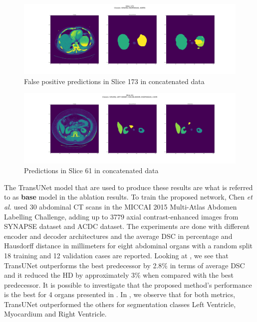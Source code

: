 \documentclass{IEEEtran}
\begin{document}
\begin{figure}[h]
\centering
\includegraphics[width=\textwidth]{img/slice_173.png}
\caption{False positive predictions in Slice 173 in concatenated data}\label{fig:slice1}
\end{figure}
\begin{figure}[h]
\centering
\includegraphics[width=\textwidth]{img/slice_61.png}
\caption{Predictions in Slice 61 in concatenated data}\label{fig:slice2}
\end{figure}

The TransUNet model that are used to produce these results are what is referred to as \textbf{base} model in the ablation results. To train the proposed network, Chen \textit{et al.} used 30 abdominal CT scans in the MICCAI 2015 Multi-Atlas Abdomen Labelling Challenge, adding up to 3779 axial contrast-enhanced images from SYNAPSE dataset and ACDC dataset. The experiments are done with different encoder and decoder architectures and the average DSC in percentage and Hausdorff distance in millimeters for eight abdominal organs with a random split 18 training and 12 validation cases are reported. Looking at , we see that TransUNet outperforms the best predecessor by 2.8\% in terms of average DSC and it reduced the HD by approximately 3\% when compared with the best predecessor. It is possible to investigate that the proposed method's performance is the best for 4 organs presented in . In , we observe that for both metrics, TransUNet outperformed the others for segmentation classes Left Ventricle, Myocardium and Right Ventricle.
\end{document}
